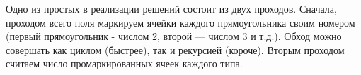 \solutionSection

Одно из простых в реализации решений состоит из двух проходов. Сначала, проходом всего поля маркируем ячейки каждого прямоугольника своим номером (первый прямоугольник - числом 2, второй — числом 3 и т.д.). Обход можно совершать как циклом (быстрее), так и рекурсией (короче). Вторым проходом считаем число промаркированных ячеек каждого типа.

\codeExample

